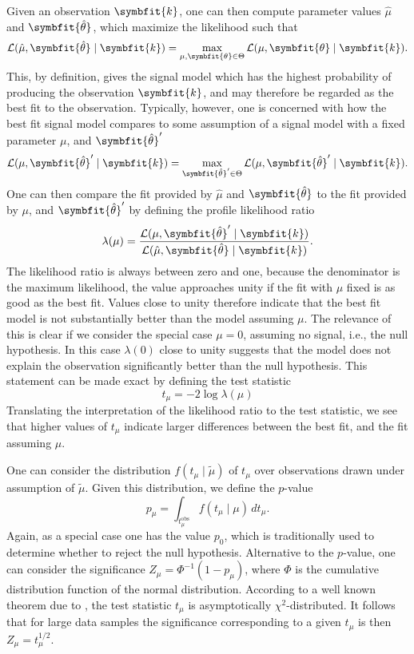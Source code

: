 \documentclass[b5paper, 10pt, twoside]{book}
\renewcommand{\vec}[1]{\symbfit{#1}}
\newcommand{\unitv}[1]{\symbfit{\hat{#1}}}
\newcommand{\difd}{\,d}
\begin{document}
Given an observation $\vec{k}$, one can then compute parameter values $\hat{\mu}$ and $\unitv{\theta}$, which maximize the likelihood such that
\begin{equation}
    \mathcal{L}(\hat{\mu},\unitv{\theta}\mid\vec{k})=\max_{\mu,\vec{\theta}\in\Theta}\mathcal{L}(\mu,\vec{\theta}\mid\vec{k}).
\end{equation}
This, by definition, gives the signal model which has the highest probability of producing the observation $\vec{k}$, and may therefore be regarded as the best fit to the observation. Typically, however, one is concerned with how the best fit signal model compares to some assumption of a signal model with a fixed parameter $\mu$, and $\unitv{\theta}'$
\begin{equation}
    \mathcal{L}(\mu,\unitv{\theta}'\mid\vec{k})=\max_{\unitv{\theta}'\in\Theta}\mathcal{L}(\mu,\unitv{\theta}'\mid\vec{k}).
\end{equation}
One can then compare the fit provided by $\hat{\mu}$ and $\unitv{\theta}$ to the fit provided by $\mu$, and $\unitv{\theta}'$ by defining the profile likelihood ratio
\begin{equation}
    \lambda(\mu)=\frac{\mathcal{L}(\mu,\unitv{\theta}'\mid\vec{k})}{\mathcal{L}(\hat{\mu},\unitv{\theta}\mid\vec{k})}.
\end{equation}
The likelihood ratio is always between zero and one, because the denominator is the maximum likelihood, the value approaches unity if the fit with $\mu$ fixed is as good as the best fit. Values close to unity therefore indicate that the best fit model is not substantially better than the model assuming $\mu$. The relevance of this is clear if we consider the special case $\mu=0$, assuming no signal, i.e., the null hypothesis. In this case $\lambda(0)$ close to unity suggests that the model does not explain the observation significantly better than the null hypothesis. This statement can be made exact by defining the test statistic
\begin{equation}
    t_\mu=-2\log\lambda(\mu)
\end{equation}
Translating the interpretation of the likelihood ratio to the test statistic, we see that higher values of $t_\mu$ indicate larger differences between the best fit, and the fit assuming $\mu$.

One can consider the distribution $f(t_\mu\mid\tilde{\mu})$ of $t_\mu$ over observations drawn under assumption of $\tilde{\mu}$. Given this distribution, we define the $p$-value
\begin{equation}
    p_\mu=\int_{t_\mu^\text{obs}}f(t_\mu\mid\mu)\difd t_\mu.
\end{equation}
Again, as a special case one has the value $p_0$, which is traditionally used to determine whether to reject the null hypothesis. Alternative to the $p$-value, one can consider the significance $Z_\mu=\Phi^{-1}(1-p_\mu)$, where $\Phi$ is the cumulative distribution function of the normal distribution. According to a well known theorem due to \textcite{Wilks1938}, the test statistic $t_\mu$ is asymptotically $\chi^2$-distributed. It follows that for large data samples the significance corresponding to a given $t_\mu$ is then $Z_\mu=t_\mu^{1/2}$.
\end{document}
